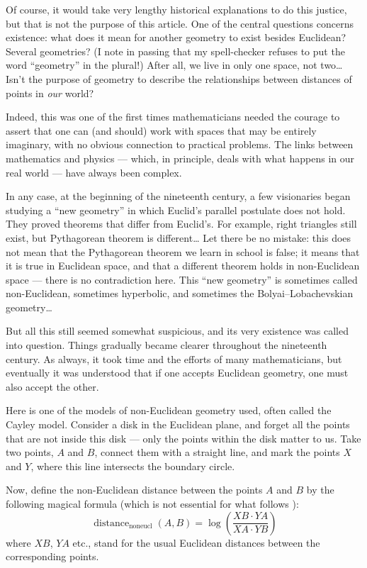 \documentclass{amsart}
\begin{document}
Of course, it would take very lengthy historical explanations to do
this justice, but that is not the purpose of this article. One of the
central questions concerns existence: what does it mean for another
geometry to exist besides Euclidean? Several geometries? (I note in
passing that my spell-checker refuses to put the word “geometry” in
the plural!) After all, we live in only one space, not two\dots{}
Isn’t the purpose of geometry to describe the relationships between
distances of points in \textit{our} world?

Indeed, this was one of the first times mathematicians needed the
courage to assert that one can (and should) work with spaces that may be
entirely imaginary, with no obvious connection to practical
problems. The links between mathematics and physics --- which, in
principle, deals with what happens in our real world --- have always
been complex.

In any case, at the beginning of the nineteenth century, a few
visionaries began studying a ``new geometry'' in which Euclid’s
parallel postulate does not hold. They proved theorems that differ
from Euclid’s. For example, right triangles still exist, but
Pythagorean theorem is different\dots{} Let there be no mistake: this
does not mean that the Pythagorean theorem we learn in school is
false; it means that it is true in Euclidean space, and that a
different theorem holds in non-Euclidean space --- there is no
contradiction here.  This ``new geometry'' is sometimes called
non-Euclidean, sometimes hyperbolic, and sometimes the
Bolyai–Lobachevskian geometry\dots{}

But all this still seemed somewhat suspicious, and its very existence
was called into question. Things gradually became clearer throughout
the nineteenth century. As always, it took time and the efforts of
many mathematicians, but eventually it was understood that if one
accepts Euclidean geometry, one must also accept the other.

Here is one of the models of non-Euclidean geometry used, often
called the Cayley model. Consider a disk in the Euclidean plane, and
forget all the points that are not inside this disk --- only the points
within the disk matter to us. Take two points, $A$ and $B$, connect
them with a straight line, and mark the points $X$ and $Y$, where this
line intersects the boundary circle.

Now, define the non-Euclidean distance between the points $A$ and $B$
by the following magical formula (which is not essential for what
follows%
):
\[
  \operatorname{distance}_{\textrm{noneucl}}(A,B)
  =
  \log\left(\frac{XB\cdot YA}{XA\cdot YB}\right)
\]
where $XB$, $YA$ etc., stand for the usual Euclidean distances between the
corresponding points.
\end{document}
